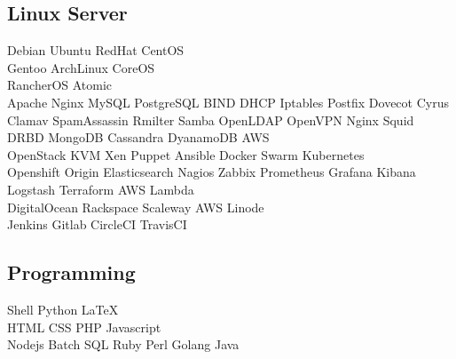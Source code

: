 \documentclass[]{deedy-resume-openfont}
\begin{document}
\begin{minipage}[t]{0.33\textwidth}
    \subsection{Linux Server}
    Debian\textbullet{} Ubuntu \textbullet{} RedHat \textbullet{} CentOS \textbullet{}\\
    Gentoo \textbullet{} ArchLinux \textbullet{} CoreOS \textbullet{}\\
    RancherOS \textbullet{} Atomic \textbullet{}\\
    Apache \textbullet{} Nginx \textbullet{} MySQL \textbullet{} PostgreSQL
    \textbullet{} BIND \textbullet{} DHCP \textbullet{} Iptables \textbullet{}
    Postfix \textbullet{} Dovecot \textbullet{} Cyrus \textbullet{} Clamav
    \textbullet{} SpamAssassin \textbullet{} Rmilter \textbullet{} Samba
    \textbullet{} OpenLDAP \textbullet{} OpenVPN \textbullet{} Nginx
    \textbullet{} Squid \textbullet{} DRBD \textbullet{} MongoDB \textbullet{}
    Cassandra \textbullet{} DyanamoDB \textbullet{} AWS \\
    OpenStack \textbullet{} KVM \textbullet{} Xen \textbullet{} Puppet
    \textbullet{} Ansible \textbullet{} Docker \textbullet{} Swarm
    \textbullet{} Kubernetes \\
    Openshift Origin \textbullet{} Elasticsearch \textbullet{} Nagios
    Zabbix \textbullet{} Prometheus \textbullet{} Grafana \textbullet{}
    Kibana \textbullet{} Logstash \textbullet{} Terraform \textbullet{} AWS Lambda\\
    DigitalOcean \textbullet{} Rackspace \textbullet{} Scaleway \textbullet{}
    AWS \textbullet{} Linode \\
    Jenkins \textbullet{} Gitlab \textbullet{} CircleCI \textbullet{} TravisCI

    \subsection{Programming}
    Shell \textbullet{} Python \textbullet{} \LaTeX\ \\
    HTML \textbullet{} CSS \textbullet{} PHP \textbullet{} Javascript \\
    Nodejs \textbullet{} Batch  \textbullet{} SQL \textbullet{} Ruby
    \textbullet{} Perl \textbullet{} Golang \textbullet{} Java
\sectionsep



\end{minipage}
\end{document}
